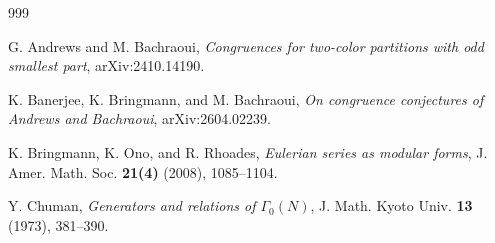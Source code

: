 \documentclass[12pt,reqno]{amsart}
\newcommand{\G}{\Gamma}
\renewcommand{\(}{\left\(}
\renewcommand{\)}{\right\)}
\numberwithin{equation}{section}
\theoremstyle{plain}
\theoremstyle{definition}
\numberwithin{equation}{section}
\newcommand{\kbf}{\bf\color{green!40!black!60!}}
\begin{document}
\begin{thebibliography}{999}
	


 G. Andrews and M. Bachraoui, {\it Congruences for two-color partitions with odd smallest part},  arXiv:2410.14190.

 K. Banerjee, K. Bringmann, and M. Bachraoui, {\it On congruence conjectures of Andrews and Bachraoui},  arXiv:2604.02239.





 K. Bringmann, K. Ono, and R. Rhoades, {\it Eulerian series as modular forms}, J.
Amer. Math. Soc. {\bf 21(4)} (2008), 1085--1104.

 Y. Chuman, {\it Generators and relations of $\G_0(N)$}, J. Math. Kyoto Univ. {\bf 13} (1973), 381--390.







\end{thebibliography}
\end{document}
